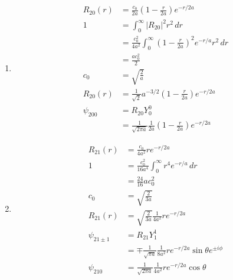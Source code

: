 \documentclass{article}
\begin{document}
\subsection{}

\begin{enumerate}
  \item

        \begin{align*}
          R_{2 0}(r) & = \frac{c_0}{2 a} \left( 1 - \frac{r}{2 a} \right) e^{-r / 2 a}                             \\
          1          & = \int_0^\infty |R_{2 0}|^2 r^2 \,d r                                                       \\
                     & = \frac{c_0^2}{4 a^2} \int_0^\infty \left( 1 - \frac{r}{2 a} \right)^2 e^{-r / a} r^2 \,d r \\
                     & = \frac{a c_0^2}{2}                                                                         \\
          c_0        & = \sqrt{\frac{2}{a}}                                                                        \\
          R_{2 0}(r) & = \frac{1}{\sqrt{2}} a^{-3 / 2} \left( 1 - \frac{r}{2 a} \right) e^{-r / 2 a}               \\
          \psi_{200} & = R_{20} Y_0^0                                                                              \\
                     & = \frac{1}{\sqrt{2 \pi a}} \frac{1}{2 a} \left( 1 - \frac{r}{2 a} \right) e^{-r / 2 a}
        \end{align*}

  \item

        \begin{align*}
          R_{2 1}(r)      & = \frac{c_0}{4 a^2} r e^{-r / 2 a}                                                     \\
          1               & = \frac{c_0^2}{16 a^4} \int_0^\infty r^4 e^{-r / a} \,d r                              \\
                          & = \frac{24}{16} a c_0^2                                                                \\
          c_0             & = \sqrt{\frac{2}{3 a}}                                                                 \\
          R_{2 1}(r)      & = \sqrt{\frac{2}{3 a}} \frac{1}{4 a^2} r e^{-r / 2 a}                                  \\
          \psi_{21 \pm 1} & = R_{21} Y_1^1                                                                         \\
                          & = \mp \frac{1}{\sqrt{\pi a}} \frac{1}{8 a^2} r e^{-r / 2 a} \sin \theta e^{\pm i \phi} \\
          \psi_{210}      & = \frac{1}{\sqrt{2 \pi a}} \frac{1}{4 a^2} r e^{-r / 2 a} \cos \theta
        \end{align*}
\end{enumerate}
\end{document}
